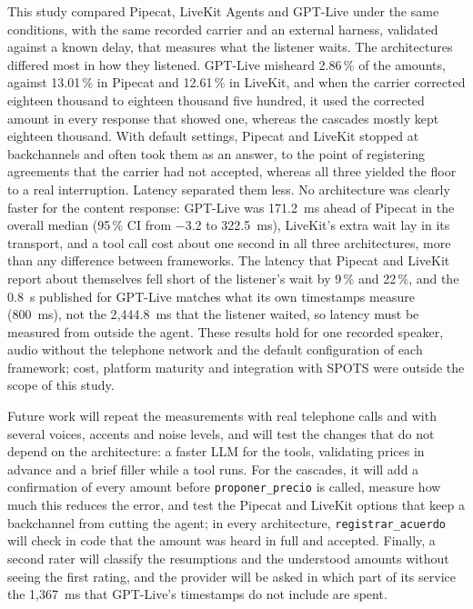 \documentclass[11pt]{article}
\newcommand{\RDifAbsUnoTres}{171.2}
\newcommand{\RDifHiUnoTres}{322.5}
\newcommand{\RDifLoUnoTres}{$-$3.2}
\newcommand{\RMontosA}{13.01}
\newcommand{\RMontosB}{12.61}
\newcommand{\RMontosC}{2.86}
\newcommand{\RObsMedC}{2{,}444.8}
\newcommand{\RPropiaFaltaPctA}{9}
\newcommand{\RPropiaFaltaPctB}{22}
\newcommand{\RRelojModeloMed}{800}
\newcommand{\RRelojServicioMed}{1{,}367}
\begin{document}
This study compared Pipecat, LiveKit Agents and GPT-Live under the same conditions, with the same recorded carrier and an external harness, validated against a known delay, that measures what the listener waits.
The architectures differed most in how they listened.
GPT-Live misheard \RMontosC\,\% of the amounts, against \RMontosA\,\% in Pipecat and \RMontosB\,\% in LiveKit, and when the carrier corrected eighteen thousand to eighteen thousand five hundred, it used the corrected amount in every response that showed one, whereas the cascades mostly kept eighteen thousand.
With default settings, Pipecat and LiveKit stopped at backchannels and often took them as an answer, to the point of registering agreements that the carrier had not accepted, whereas all three yielded the floor to a real interruption.
Latency separated them less.
No architecture was clearly faster for the content response: GPT-Live was \RDifAbsUnoTres~ms ahead of Pipecat in the overall median (95\,\% CI from \RDifLoUnoTres{} to \RDifHiUnoTres~ms), LiveKit's extra wait lay in its transport, and a tool call cost about one second in all three architectures, more than any difference between frameworks.
The latency that Pipecat and LiveKit report about themselves fell short of the listener's wait by \RPropiaFaltaPctA\,\% and \RPropiaFaltaPctB\,\%, and the 0.8~s published for GPT-Live matches what its own timestamps measure (\RRelojModeloMed~ms), not the \RObsMedC~ms that the listener waited, so latency must be measured from outside the agent.
These results hold for one recorded speaker, audio without the telephone network and the default configuration of each framework; cost, platform maturity and integration with SPOTS were outside the scope of this study.

Future work will repeat the measurements with real telephone calls and with several voices, accents and noise levels, and will test the changes that do not depend on the architecture: a faster LLM for the tools, validating prices in advance and a brief filler while a tool runs.
For the cascades, it will add a confirmation of every amount before \texttt{proponer\_precio} is called, measure how much this reduces the error, and test the Pipecat and LiveKit options that keep a backchannel from cutting the agent; in every architecture, \texttt{registrar\_acuerdo} will check in code that the amount was heard in full and accepted.
Finally, a second rater will classify the resumptions and the understood amounts without seeing the first rating, and the provider will be asked in which part of its service the \RRelojServicioMed~ms that GPT-Live's timestamps do not include are spent.
\end{document}
